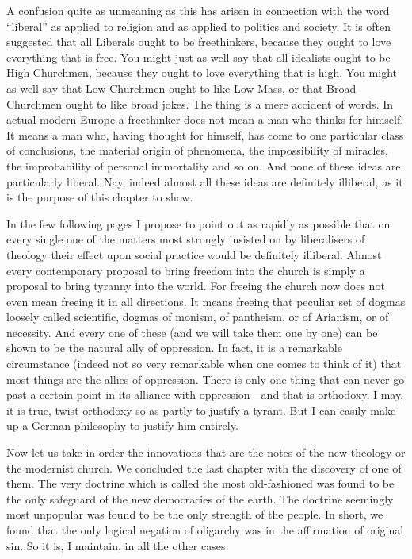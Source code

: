 A confusion quite as unmeaning as this has arisen in connection with the word “liberal” as applied to religion and as applied to politics and society. It is often suggested that all Liberals ought to be freethinkers, because they ought to love everything that is free. You might just as well say that all idealists ought to be High Churchmen, because they ought to love everything that is high. You might as well say that Low Churchmen ought to like Low Mass, or that Broad Churchmen ought to like broad jokes. The thing is a mere accident of words. In actual modern Europe a freethinker does not mean a man who thinks for himself. It means a man who, having thought for himself, has come to one particular class of conclusions, the material origin of phenomena, the impossibility of miracles, the improbability of personal immortality and so on. And none of these ideas are particularly liberal. Nay, indeed almost all these ideas are definitely illiberal, as it is the purpose of this chapter to show.

In the few following pages I propose to point out as rapidly as possible that on every single one of the matters most strongly insisted on by liberalisers of theology their effect upon social practice would be definitely illiberal. Almost every contemporary proposal to bring freedom into the church is simply a proposal to bring tyranny into the world. For freeing the church now does not even mean freeing it in all directions. It means freeing that peculiar set of dogmas loosely called scientific, dogmas of monism, of pantheism, or of Arianism, or of necessity. And every one of these (and we will take them one by one) can be shown to be the natural ally of oppression. In fact, it is a remarkable circumstance (indeed not so very remarkable when one comes to think of it) that most things are the allies of oppression. There is only one thing that can never go past a certain point in its alliance with oppression—and that is orthodoxy. I may, it is true, twist orthodoxy so as partly to justify a tyrant. But I can easily make up a German philosophy to justify him entirely.

Now let us take in order the innovations that are the notes of the new theology or the modernist church. We concluded the last chapter with the discovery of one of them. The very doctrine which is called the most old-fashioned was found to be the only safeguard of the new democracies of the earth. The doctrine seemingly most unpopular was found to be the only strength of the people. In short, we found that the only logical negation of oligarchy was in the affirmation of original sin. So it is, I maintain, in all the other cases.

